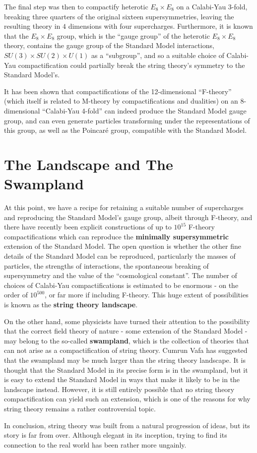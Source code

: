 \documentclass[12pt]{article}
\begin{document}
The final step was then to compactify heterotic $E_8 \times E_8$ on a Calabi-Yau 3-fold, breaking three quarters of the original sixteen supersymmetries, leaving the resulting theory in $4$ dimensions with four supercharges. Furthermore, it is known that the $E_8 \times E_8$ group, which is the ``gauge group'' of the  heterotic $E_8 \times E_8$ theory, contains the gauge group of the Standard Model interactions, $SU(3) \times SU(2) \times U(1)$ as a ``subgroup'', and so a suitable choice of Calabi-Yau compactification could partially break the string theory's symmetry to the Standard Model's.
\newline

It has been shown that compactifications of the 12-dimensional ``F-theory'' (which itself is related to M-theory by compactifications and dualities) on an 8-dimensional ``Calabi-Yau 4-fold'' can indeed produce the Standard Model gauge group, and can even generate particles transforming under the representations of this group, as well as the Poincaré group, compatible with the Standard Model.

\section{The Landscape and The Swampland}

At this point, we have a recipe for retaining a suitable number of supercharges and reproducing the Standard Model's gauge group, albeit through F-theory, and there have recently been explicit constructions of up to $10^{15}$ F-theory compactifications which can reproduce the \textbf{minimally supersymmetric} extension of the Standard Model. The open question is whether the other fine details of the Standard Model can be reproduced, particularly the masses of particles, the strengths of interactions, the spontaneous breaking of supersymmetry and the value of the ``cosmological constant''. The number of choices of Calabi-Yau compactifications is estimated to be enormous - on the order of $10^{500}$, or far more if including F-theory. This huge extent of possibilities is known as the \textbf{string theory landscape}.
\newline

On the other hand, some physicists have turned their attention to the possibility that the correct field theory of nature - some extension of the Standard Model - may belong to the so-called \textbf{swampland}, which is the collection of theories that can not arise as a compactification of string theory. Cumrun Vafa has suggested that the swampland may be much larger than the string theory landscape. It is thought that the Standard Model in its precise form is in the swampland, but it is easy to extend the Standard Model in ways that make it likely to be in the landscape instead. However, it is still entirely possible that no string theory compactification can yield such an extension, which is one of the reasons for why string theory remains a rather controversial topic.
\newline

In conclusion, string theory was built from a natural progression of ideas, but its story is far from over. Although elegant in its inception, trying to find its connection to the real world has been rather more ungainly.
\end{document}

